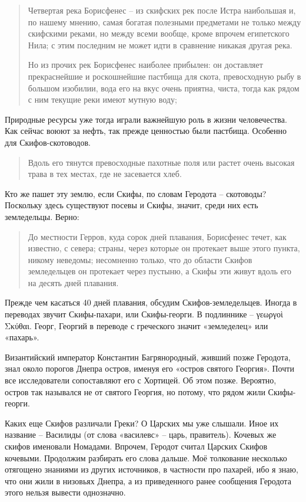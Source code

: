 \begin{quotation}
Четвертая река Борисфенес – из скифских рек после Истра наибольшая и, по нашему мнению, самая богатая полезными предметами не только между скифскими реками, но между всеми вообще, кроме впрочем египетского Нила; с этим последним не может идти в сравнение никакая другая река.

Но из прочих рек Борисфенес наиболее прибылен: он доставляет прекраснейшие и роскошнейшие пастбища для скота, превосходную рыбу в большом изобилии, вода его на вкус очень приятна, чиста, тогда как рядом с ним текущие реки имеют мутную воду;
\end{quotation}

Природные ресурсы уже тогда играли важнейшую роль в жизни человечества. Как сейчас воюют за нефть, так прежде ценностью были пастбища. Особенно для Скифов-скотоводов.

\begin{quotation}
Вдоль его тянутся превосходные пахотные поля или растет очень высокая трава в тех местах, где не засевается хлеб.
\end{quotation}

Кто же пашет эту землю, если Скифы, по словам Геродота – скотоводы? Поскольку здесь существуют посевы и Скифы, значит, среди них есть земледельцы. Верно:

\begin{quotation}
До местности Герров, куда сорок дней плавания, Борисфенес течет, как известно, с севера; страны, через которые он протекает выше этого пункта, никому неведомы; несомненно только, что до области Скифов земледельцев он протекает через пустыню, а Скифы эти живут вдоль его на десять дней плавания.
\end{quotation}

Прежде чем касаться 40 дней плавания, обсудим Скифов-земледельцев. Иногда в переводах звучит Скифы-пахари, или Скифы-георги. В подлиннике – γεωργοὶ Σκύθ\-αι. Георг, Георгий в переводе с греческого значит «земледелец» или «пахарь».

Византийский император Константин Багрянородный, живший позже Геродота, знал около порогов Днепра остров, именуя его «остров святого Георгия». Почти все исследователи сопоставляют его с Хортицей. Об этом позже. Вероятно, остров так назывался не от святого Георгия, но потому, что рядом жили Скифы-георги. 

Каких еще Скифов различали Греки? О Царских мы уже слышали. Иное их название – Василиды (от слова «василевс» – царь, правитель). Кочевых же скифов именовали Номадами. Впрочем, Геродот считал Царских Скифов кочевыми. Продолжим разбирать его слова дальше. Моё толкование несколько отягощено знаниями из других источников, в частности про пахарей, ибо я знаю, что они жили в низовьях Днепра, а из приведенного ранее сообщения Геродота этого нельзя вывести однозначно.

